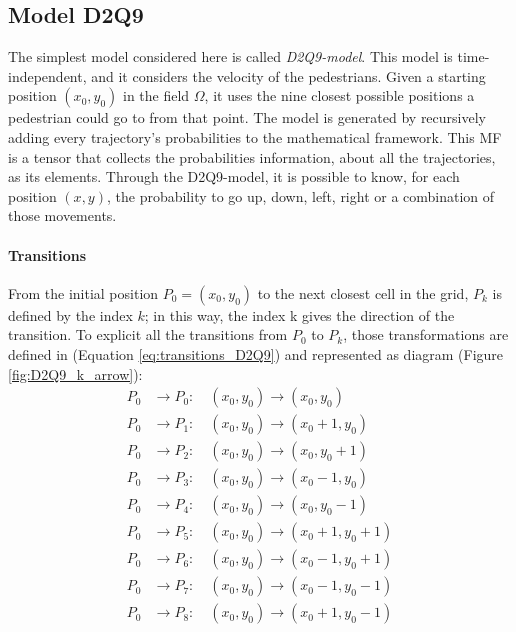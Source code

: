 \documentclass[class=article, crop=false]{standalone}
\begin{document}
\FloatBarrier
\newpage
\subsection{Model D2Q9} \label{chap:Model_D2Q9}

The simplest model considered here is called \emph{D2Q9-model}. 
This model is time-independent, and it considers the velocity of the pedestrians. 
Given a starting position $(x_0, y_0)$ in the field $\Omega$, it uses the nine closest possible positions a pedestrian could go to from that point. 
The model is generated by recursively adding every trajectory's probabilities to the mathematical framework.
This MF is a tensor that collects the probabilities information, about all the trajectories, as its elements.
Through the D2Q9-model, it is possible to know, for each position $(x, y)$, the probability to go up, down, left, right or a combination of those movements.


\paragraph{Transitions} 
From the initial position $P_0=(x_0, y_0)$ to the next closest cell in the grid, $P_k$ is defined by the index $k$; in this way, the index k gives the direction of the transition. 
To explicit all the transitions from $P_0$ to $P_k$, those transformations are defined in (Equation \ref{eq:transitions_D2Q9}) and represented as diagram (Figure \ref{fig:D2Q9_k_arrow}):
\begin{equation}
\begin{split}
P_0 &\to P_0 : \quad (x_0, y_0) \to (x_0, y_0) \\
P_0 &\to P_1 : \quad (x_0, y_0) \to (x_0+1, y_0) \\
P_0 &\to P_2 : \quad (x_0, y_0) \to (x_0, y_0+1) \\
P_0 &\to P_3 : \quad (x_0, y_0) \to (x_0-1, y_0) \\
P_0 &\to P_4 : \quad (x_0, y_0) \to (x_0, y_0-1) \\
P_0 &\to P_5 : \quad (x_0, y_0) \to (x_0+1, y_0+1) \\
P_0 &\to P_6 : \quad (x_0, y_0) \to (x_0-1, y_0+1) \\
P_0 &\to P_7 : \quad (x_0, y_0) \to (x_0-1, y_0-1) \\
P_0 &\to P_8 : \quad (x_0, y_0) \to (x_0+1, y_0-1) \\
\end{split}
\label{eq:transitions_D2Q9}
\end{equation}
\end{document}
